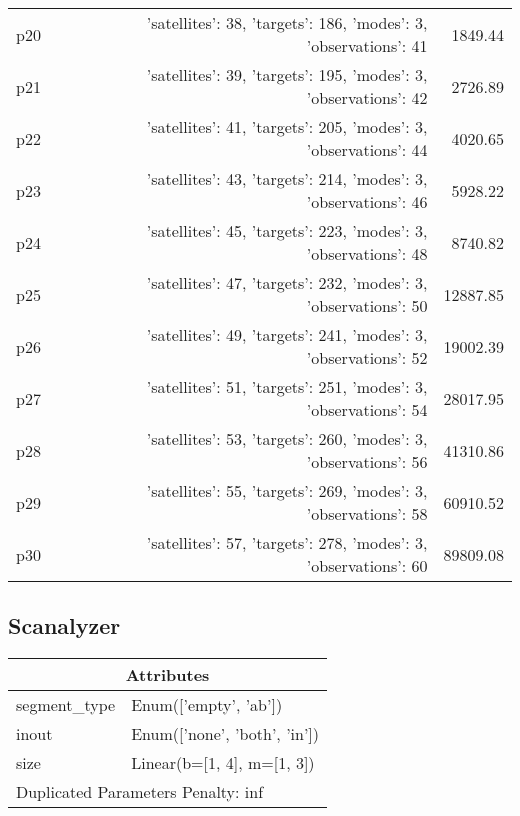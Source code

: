 \documentclass{article}
\begin{document}
\begin{center}
\begin{tabular}{@{}l|r|r@{}}
  p20&{'satellites': 38, 'targets': 186, 'modes': 3, 'observations': 41}&1849.44\\
  p21&{'satellites': 39, 'targets': 195, 'modes': 3, 'observations': 42}&2726.89\\
  p22&{'satellites': 41, 'targets': 205, 'modes': 3, 'observations': 44}&4020.65\\
  p23&{'satellites': 43, 'targets': 214, 'modes': 3, 'observations': 46}&5928.22\\
  p24&{'satellites': 45, 'targets': 223, 'modes': 3, 'observations': 48}&8740.82\\
  p25&{'satellites': 47, 'targets': 232, 'modes': 3, 'observations': 50}&12887.85\\
  p26&{'satellites': 49, 'targets': 241, 'modes': 3, 'observations': 52}&19002.39\\
  p27&{'satellites': 51, 'targets': 251, 'modes': 3, 'observations': 54}&28017.95\\
  p28&{'satellites': 53, 'targets': 260, 'modes': 3, 'observations': 56}&41310.86\\
  p29&{'satellites': 55, 'targets': 269, 'modes': 3, 'observations': 58}&60910.52\\
  p30&{'satellites': 57, 'targets': 278, 'modes': 3, 'observations': 60}&89809.08
                            \end{tabular}
                            \end{center}
                    
                            \newpage \subsection{Scanalyzer}
                    \begin{center}
                    \begin{tabular}{@{}p{}p{}@{}}
                    \multicolumn{2}{c}{\bf \large Attributes}\\\midrule
                    segment\_type & Enum(['empty', 'ab'])\\
inout & Enum(['none', 'both', 'in'])\\
size & Linear(b=[1, 4], m=[1, 3]) \\\midrule
                    \multicolumn{2}{l}{Duplicated Parameters Penalty: inf}
                    \end{tabular}
                    \end{center}
                
\end{document}
